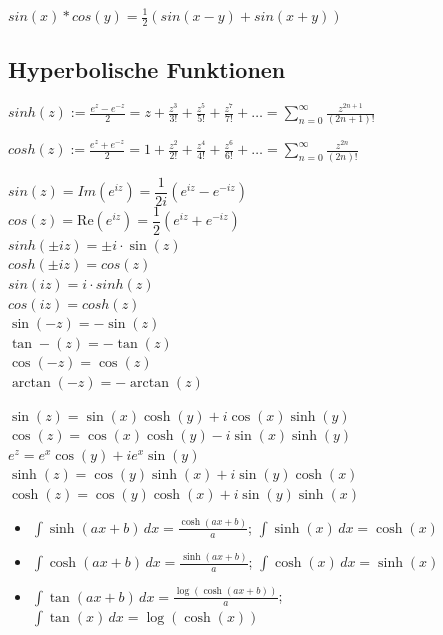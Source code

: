 $sin(x)*cos(y) = \frac{1}{2}(sin(x-y)+sin(x+y))$ \\



\subsection{Hyperbolische Funktionen}
$sinh(z) := \frac{e^z - e^{-z}}{2} = z + \frac{z^3}{3!} + \frac{z^5}{5!} + \frac{z^7}{7!} + \dots = \sum_{n=0}^\infty \frac{z^{2n+1}}{(2n+1)!}$

$cosh(z) := \frac{e^z + e^{-z}}{2}= 1 + \frac{z^2}{2!} + \frac{z^4}{4!} + \frac{z^6}{6!} + \dots = \sum_{n=0}^\infty \frac{z^{2n}}{(2n)!}$

$sin(z)= Im(e^{iz})=\dfrac{1}{2i} (e^{iz}-e^{-iz})$ \\

$cos(z)=\text{Re}(e^{iz})=\dfrac{1}{2}(e^{iz}+e^{-iz})$ \\

$sinh(\pm iz) = \pm i \cdot \sin(z)$\\
$cosh(\pm iz) = cos(z)$\\
$sin(iz)= i\cdot sinh(z)$\\
$cos(iz)=cosh(z)$\\

$ \sin(-z) = - \sin(z) $\\
$ \tan-(z) = -\tan(z) $\\
$ \cos(-z) = \cos(z) $ \\
$ \arctan(-z) = -\arctan(z) $

$\sin(z) = \sin(x)\cosh(y) + i\cos(x)\sinh(y)$\\
$\cos(z) = \cos(x)\cosh(y) - i\sin(x)\sinh(y)$\\
$e^z = e^x \cos(y) + i e^x \sin(y)$\\
$\sinh(z) = \cos(y)\sinh(x) + i\sin(y)\cosh(x)$\\
$\cosh(z) = \cos(y)\cosh(x) + i\sin(y)\sinh(x)$	

\begin{itemize}[leftmargin=*]
	\item $\int \sinh(ax + b) \,dx = \frac{\cosh(ax + b)}{a}$; $\int \sinh(x) \,dx
	= \cosh(x)$
	\item $\int \cosh(ax + b) \,dx = \frac{\sinh(ax + b)}{a}$; $\int \cosh(x) \,dx
	= \sinh(x)$
	\item $\int \tan(ax + b) \,dx = \frac{\log(\cosh(ax+b))}{a}$; $\int \tan(x)
	\,dx = \log(\cosh(x))$
\end{itemize}


